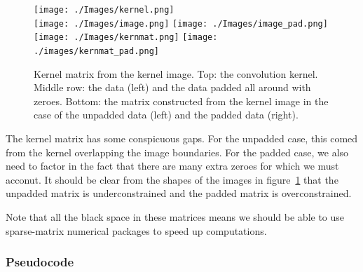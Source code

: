 \documentclass[letterpaper, 11pt]{article}
\begin{document}
\begin{figure}[h]
	\centering
	\texttt{[image: ./Images/kernel.png]}\\\vspace{1mm}
	\texttt{[image: ./Images/image.png]}
	\texttt{[image: ./Images/image\_pad.png]}\\\vspace{1mm}
	\texttt{[image: ./Images/kernmat.png]}
	\texttt{[image: ./images/kernmat\_pad.png]}
	\caption{Kernel matrix from the kernel image. Top: the convolution kernel. Middle row: the data (left) and the data padded all around with zeroes. Bottom: the matrix constructed from the kernel image in the case of the unpadded data (left) and the padded data (right).}
	\label{fig:kernmat_pad}
\end{figure}

The kernel matrix has some conspicuous gaps. For the unpadded case, this comed from the kernel overlapping the image boundaries. For the padded case, we also need to factor in the fact that there are many extra zeroes for which we must acconut. It should be clear from the shapes of the images in figure~\ref{fig:kernmat_pad} that the unpadded matrix is underconstrained and the padded matrix is overconstrained.

Note that all the black space in these matrices means we should be able to use sparse-matrix numerical packages to speed up computations.

\subsubsection{Pseudocode}
\label{sec:decon_pseudocode}
\end{document}
